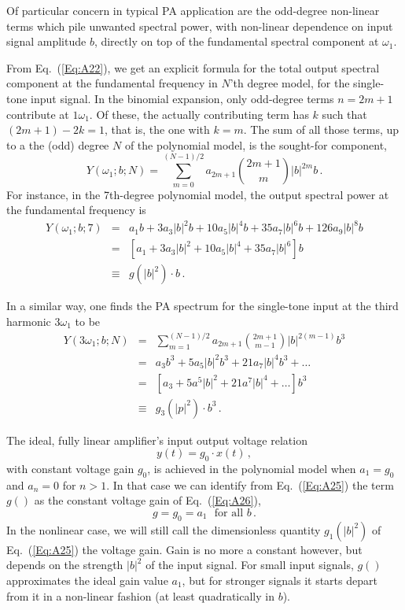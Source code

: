 \documentclass[11pt,oneside,a4paper]{scrartcl}
\newcommand{\EQ}[1]{\begin{equation}\label{Eq:#1}}
\newcommand{\EE}{\end{equation}}
\newcommand{\Eq}[1]{Eq.~(\ref{Eq:#1})}
\newcommand{\abs}[1]{\ensuremath{|#1|}}
\newcommand{\Abs}[1]{\ensuremath{\left|#1\right|}}
\begin{document}
Of particular concern in typical PA application are the odd-degree non-linear terms which pile unwanted spectral power, with non-linear dependence on input signal amplitude $b$, directly on top of the fundamental spectral component at $\omega_1$.

From \Eq{A22}, we get an explicit formula for the total output spectral component at the fundamental frequency in $N$'th degree model, for the single-tone input signal. In the binomial expansion, only odd-degree terms $n = 2m+1$ contribute at $1\omega_1$. Of these, the actually contributing term has $k$ such that $(2m+1) - 2k = 1$, that is, the one with $k = m$. The sum of all those terms, up to a the (odd) degree $N$ of the polynomial model, is the sought-for component,
\EQ{A24}
	Y(\omega_1;b;N) = \sum_{m=0}^{(N-1)/2} a_{2m+1} \binom{2m+1}{m} \Abs{b}^{2m} b \,.
\EE 
For instance, in the 7th-degree polynomial model, the output spectral power at the fundamental frequency is
\begin{eqnarray}
	Y(\omega_1;b;7) &=& 
					a_1 b 
					+ 3 a_3 \Abs{b}^2 b 
					+ 10 a_5 \Abs{b}^4 b 
					+ 35 a_7 \Abs{b}^6 b 
					+ 126 a_9 \Abs{b}^8 b 
																\nonumber \\
					&=& 	
					\left[ a_1
					+ 3 a_3 \Abs{b}^2
					+ 10 a_5 \Abs{b}^4 
					+ 35 a_7 \Abs{b}^6 
					\right] b
																\label{Eq:A24bb} \\
					&\equiv& 	
					g(\abs{b}^2) \cdot b
					\,.
																\label{Eq:A25}
\end{eqnarray}

In a similar way, one finds the PA spectrum for the single-tone input at the third harmonic $3\omega_1$ to be
\begin{eqnarray}
	Y(3\omega_1;b;N) 
	&=& 
		\sum_{m=1}^{(N-1)/2} 
		a_{2m+1} \binom{2m+1}{m-1} \Abs{b}^{2(m-1)} b^3 
		\label{Eq:A24b} \\
	&=& 
		a_3b^3	+ 5 a_5 \abs{b}^2 b^3 + 21 a_7 \abs{b}^4 b^3 + \dots 	 
	 	\label{Eq:A24c} \\
	&=& 
		\left[ 
		a_3 
		+ 5 a^5 \abs{b}^2 
		+ 21 a^7 \abs{b}^4
		+ \dots 
		\right]	b^3	
	 	\label{Eq:A24d} \\
	&\equiv& 	
		g_3(\abs{p}^2) \cdot b^3
	\,.	
\end{eqnarray}

The ideal, fully linear amplifier's input output voltage relation
\EQ{A26}
	y(t) = g_0 \cdot x(t)\,,
\EE
with constant voltage gain $g_0$,
is achieved in the polynomial model when $a_1 = g_0$ and $a_n = 0$ for $n > 1$. 
In that case we can identify from \Eq{A25}
the term $g()$ as the constant voltage gain of \Eq{A26},
\[
	g = g_0 = a_1	\,\, \mbox{ for all $b$}\,.
\]
In the nonlinear case, we will still call the dimensionless quantity $g_1(\abs{b}^2)$ of \Eq{A25} the voltage gain. Gain is no more a constant however, but depends on the strength
$\abs{b}^2$ of the input signal. For small input signals, $g()$ approximates the ideal gain value $a_1$, but for stronger signals it starts depart from it in a non-linear fashion (at least quadratically in $b$). 
\end{document}
